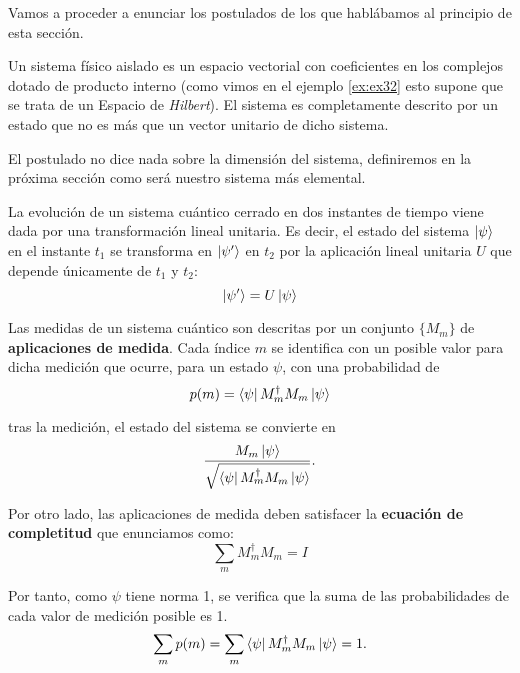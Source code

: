 Vamos a proceder a enunciar los postulados de los que hablábamos al principio de esta sección.

\begin{postulate} Un sistema físico aislado es un espacio vectorial con coeficientes en los complejos dotado de producto interno (como vimos en el ejemplo \ref{ex:ex32} esto supone que se trata de un Espacio de \textit{Hilbert}). El sistema es completamente descrito por un estado que no es más que un vector unitario de dicho sistema.
\end{postulate}

El postulado no dice nada sobre la dimensión del sistema, definiremos en la próxima sección como será nuestro sistema más elemental.

\begin{postulate} La evolución de un sistema cuántico cerrado en dos instantes de tiempo viene dada por una transformación lineal unitaria. Es decir, el estado del sistema $\left|\psi\right\rangle$ en el instante $t_1$ se transforma en $\left|\psi'\right\rangle$ en $t_2$ por la aplicación lineal unitaria $U$ que depende únicamente de $t_1$ y $t_2$:
\begin{equation}
\left|\psi'\right\rangle=U\left|\psi\right\rangle
\end{equation}
\end{postulate}

\begin{postulate} Las medidas de un sistema cuántico son descritas por un conjunto $\{M_m \}$ de \textbf{aplicaciones de medida}. Cada índice $m$ se identifica con un posible valor para dicha medición que ocurre, para un estado $\psi$, con una probabilidad de 
\begin{equation}
p(m)=\left\langle\psi\right|M_m^\dag M_m\left|\psi\right\rangle
\end{equation}

tras la medición, el estado del sistema se convierte en
\begin{equation}
\dfrac{M_m\left|\psi\right\rangle}{\sqrt{\left\langle\psi\right|M_m^\dag M_m\left|\psi\right\rangle}}.
\end{equation}

Por otro lado, las aplicaciones de medida deben satisfacer la \textbf{ecuación de completitud} que enunciamos como:
\begin{equation}
\sum_m M_m^\dag M_m = I
\end{equation}

Por tanto, como $\psi$ tiene norma 1, se verifica que la suma de las probabilidades de cada valor de medición posible es 1.
\begin{equation}
\sum_m p(m)=\sum_m \left\langle\psi\right|M_m^\dag M_m\left|\psi\right\rangle = 1.
\end{equation}
\end{postulate}


